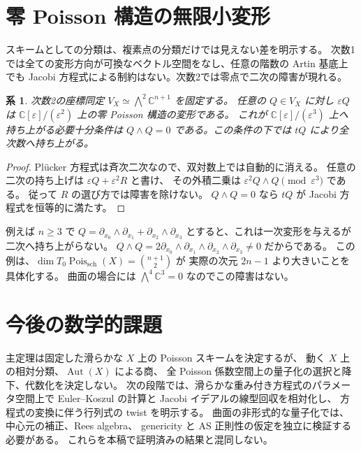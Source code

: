 \documentclass[a4paper,11pt]{ltjsarticle}
\numberwithin{equation}{section}
\theoremstyle{plain}
\newtheorem{corollary}[theorem]{系}
\theoremstyle{definition}
\newcommand{\C}{\mathbb C}
\newcommand{\Pois}{\operatorname{Pois}}
\begin{document}
\section{零 Poisson 構造の無限小変形}
\label{sec:infinitesimal}
スキームとしての分類は、複素点の分類だけでは見えない差を明示する。
次数1では全ての変形方向が可換なベクトル空間をなし、任意の階数の Artin 基底上でも
Jacobi 方程式による制約はない。次数2では零点で二次の障害が現れる。

\begin{corollary}
\label{cor:second-order}
次数2の座標同定 $V_X\simeq\bigwedge^2\C^{n+1}$ を固定する。
任意の $Q\in V_X$ に対し $\varepsilon Q$ は
$\C[\varepsilon]/(\varepsilon^2)$ 上の零 Poisson 構造の変形である。
これが $\C[\varepsilon]/(\varepsilon^3)$ 上へ持ち上がる必要十分条件は
$Q\wedge Q=0$ である。この条件の下では $tQ$ により全次数へ持ち上がる。
\end{corollary}
\begin{proof}
Pl\"ucker 方程式は斉次二次なので、双対数上では自動的に消える。
任意の二次の持ち上げは $\varepsilon Q+\varepsilon^2R$ と書け、
その外積二乗は $\varepsilon^2Q\wedge Q\pmod{\varepsilon^3}$ である。
従って $R$ の選び方では障害を除けない。
$Q\wedge Q=0$ なら $tQ$ が Jacobi 方程式を恒等的に満たす。
\end{proof}

例えば $n\geq3$ で
$Q=\partial_{x_0}\wedge\partial_{x_1}+\partial_{x_2}\wedge\partial_{x_3}$
とすると、これは一次変形を与えるが二次へ持ち上がらない。
$Q\wedge Q=2\partial_{x_0}\wedge\partial_{x_1}\wedge
\partial_{x_2}\wedge\partial_{x_3}\neq0$ だからである。
この例は、$\dim T_0\Pois_{\mathrm{sch}}(X)=\binom{n+1}{2}$ が
実際の次元 $2n-1$ より大きいことを具体化する。
曲面の場合には $\bigwedge^4\C^3=0$ なのでこの障害はない。

\section{今後の数学的課題}
\label{sec:open}
主定理は固定した滑らかな $X$ 上の Poisson スキームを決定するが、
動く $X$ 上の相対分類、$\operatorname{Aut}(X)$ による商、
全 Poisson 係数空間上の量子化の選択と降下、代数化を決定しない。
次の段階では、滑らかな重み付き方程式のパラメータ空間上で
Euler--Koszul の計算と Jacobi イデアルの線型回収を相対化し、
方程式の変換に伴う行列式の twist を明示する。
曲面の非形式的な量子化では、中心元の補正、Rees algebra、
genericity と AS 正則性の仮定を独立に検証する必要がある。
これらを本稿で証明済みの結果と混同しない。



\end{document}
